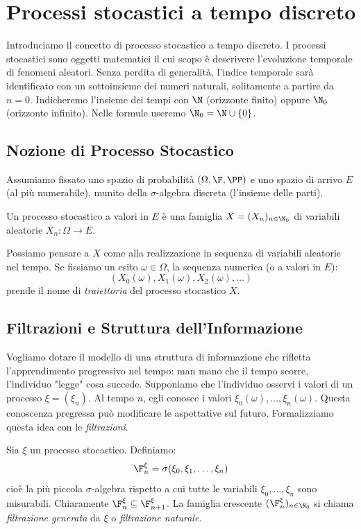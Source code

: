 
\chapter{Processi stocastici a tempo discreto}

Introduciamo il concetto di processo stocastico a tempo discreto. I processi stocastici sono oggetti matematici il cui scopo è descrivere l'evoluzione temporale di fenomeni aleatori. 
Senza perdita di generalità, l'indice temporale sarà identificato con un sottoinsieme dei numeri naturali, solitamente a partire da $n=0$. Indicheremo l'insieme dei tempi con $\N$ (orizzonte finito) oppure $\N_0$ (orizzonte infinito). Nelle formule useremo $\N_0 = \N \cup \{0\}$.

\section{Nozione di Processo Stocastico}

Assumiamo fissato uno spazio di probabilità $(\Omega, \F, \PP)$ e uno spazio di arrivo $E$ (al più numerabile), munito della $\sigma$-algebra discreta (l'insieme delle parti).

\begin{definition}
Un processo stocastico a valori in $E$ è una famiglia $X = (X_n)_{n \in \N_0}$ di variabili aleatorie $X_n : \Omega \to E$.
\end{definition}

Possiamo pensare a $X$ come alla realizzazione in sequenza di variabili aleatorie nel tempo. Se fissiamo un esito $\omega \in \Omega$, la sequenza numerica (o a valori in $E$):
\[ (X_0(\omega), X_1(\omega), X_2(\omega), \dots) \]
prende il nome di \emph{traiettoria} del processo stocastico $X$.

\section{Filtrazioni e Struttura dell'Informazione}

Vogliamo dotare il modello di una struttura di informazione che rifletta l'apprendimento progressivo nel tempo: man mano che il tempo scorre, l'individuo "legge" cosa succede.
Supponiamo che l'individuo osservi i valori di un processo $\xi = (\xi_n)$. Al tempo $n$, egli conosce i valori $\xi_0(\omega), \dots, \xi_n(\omega)$. Questa conoscenza pregressa può modificare le aspettative sul futuro.
Formalizziamo questa idea con le \emph{filtrazioni}.

\begin{definition}
Sia $\xi$ un processo stocastico. Definiamo:
\[ \F_n^\xi = \sigma(\xi_0, \xi_1, \dots, \xi_n) \]
cioè la più piccola $\sigma$-algebra rispetto a cui tutte le variabili $\xi_0, \dots, \xi_n$ sono misurabili.
Chiaramente $\F_n^\xi \subseteq \F_{n+1}^\xi$. La famiglia crescente $(\F_n^\xi)_{n \in \N_0}$ si chiama \emph{filtrazione generata} da $\xi$ o \emph{filtrazione naturale}.
\end{definition}

